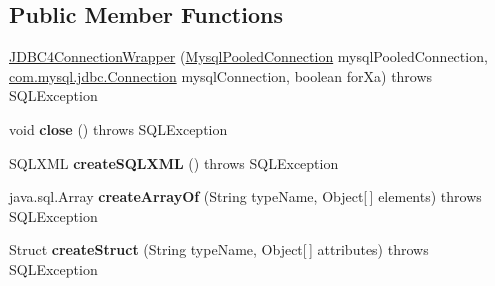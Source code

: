 \subsection*{Public Member Functions}
\begin{DoxyCompactItemize}
\item 
\mbox{\hyperlink{classcom_1_1mysql_1_1jdbc_1_1jdbc2_1_1optional_1_1_j_d_b_c4_connection_wrapper_a505ead6cf4c8609d2a8629cb52f2ce44}{J\+D\+B\+C4\+Connection\+Wrapper}} (\mbox{\hyperlink{classcom_1_1mysql_1_1jdbc_1_1jdbc2_1_1optional_1_1_mysql_pooled_connection}{Mysql\+Pooled\+Connection}} mysql\+Pooled\+Connection, \mbox{\hyperlink{interfacecom_1_1mysql_1_1jdbc_1_1_connection}{com.\+mysql.\+jdbc.\+Connection}} mysql\+Connection, boolean for\+Xa)  throws S\+Q\+L\+Exception 
\item 
\mbox{\label{classcom_1_1mysql_1_1jdbc_1_1jdbc2_1_1optional_1_1_j_d_b_c4_connection_wrapper_a7ca0a5c2516963e761fe20fc54ec5b2a}} 
void {\bfseries close} ()  throws S\+Q\+L\+Exception 
\item 
\mbox{\label{classcom_1_1mysql_1_1jdbc_1_1jdbc2_1_1optional_1_1_j_d_b_c4_connection_wrapper_ab1d8bc4a5acb20fdf83b2252195ca44b}} 
S\+Q\+L\+X\+ML {\bfseries create\+S\+Q\+L\+X\+ML} ()  throws S\+Q\+L\+Exception 
\item 
\mbox{\label{classcom_1_1mysql_1_1jdbc_1_1jdbc2_1_1optional_1_1_j_d_b_c4_connection_wrapper_a3606c0cd7e4de6e70c97856cdfed9c47}} 
java.\+sql.\+Array {\bfseries create\+Array\+Of} (String type\+Name, Object\mbox{[}$\,$\mbox{]} elements)  throws S\+Q\+L\+Exception 
\item 
\mbox{\label{classcom_1_1mysql_1_1jdbc_1_1jdbc2_1_1optional_1_1_j_d_b_c4_connection_wrapper_a358193a45173c9772de14c750ae09c80}} 
Struct {\bfseries create\+Struct} (String type\+Name, Object\mbox{[}$\,$\mbox{]} attributes)  throws S\+Q\+L\+Exception 
\item 
\mbox{\label{classcom_1_1mysql_1_1jdbc_1_1jdbc2_1_1optional_1_1_j_d_b_c4_connection_wrapper_aa3d0fd6efebb6f1ed9f6554c6593c28d}} 

\end{DoxyCompactItemize}
